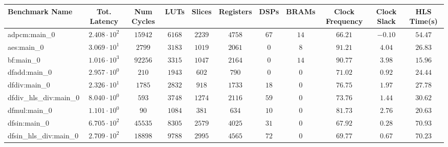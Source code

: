 \begin{tabular}{|l|c|c|c|c|c|c|c|c|c|c|}
\hline
Benchmark Name          & Tot. Latency           & Num Cycles & LUTs      & Slices    & Registers & DSPs    & BRAMs   & Clock Frequency & Clock Slack & HLS Time(s) \\
\hline
adpcm:main\_0           & $ 2.408 \cdot 10^{2} $ & $ 15942  $ & $ 6168  $ & $ 2239  $ & $ 4758  $ & $ 67  $ & $ 14  $ & $ 66.21       $ & $ -0.10   $ & $ 54.47   $ \\
aes:main\_0             & $ 3.069 \cdot 10^{1} $ & $ 2799   $ & $ 3183  $ & $ 1019  $ & $ 2061  $ & $ 0   $ & $ 8   $ & $ 91.21       $ & $ 4.04    $ & $ 26.83   $ \\
bf:main\_0              & $ 1.016 \cdot 10^{3} $ & $ 92256  $ & $ 3315  $ & $ 1047  $ & $ 2164  $ & $ 0   $ & $ 14  $ & $ 90.77       $ & $ 3.98    $ & $ 15.96   $ \\
dfadd:main\_0           & $ 2.957 \cdot 10^{0} $ & $ 210    $ & $ 1943  $ & $ 602   $ & $ 790   $ & $ 0   $ & $ 0   $ & $ 71.02       $ & $ 0.92    $ & $ 24.44   $ \\
dfdiv:main\_0           & $ 2.326 \cdot 10^{1} $ & $ 1785   $ & $ 2832  $ & $ 918   $ & $ 1733  $ & $ 18  $ & $ 0   $ & $ 76.75       $ & $ 1.97    $ & $ 27.78   $ \\
dfdiv\_hls\_div:main\_0 & $ 8.040 \cdot 10^{0} $ & $ 593    $ & $ 3748  $ & $ 1274  $ & $ 2116  $ & $ 59  $ & $ 0   $ & $ 73.76       $ & $ 1.44    $ & $ 30.62   $ \\
dfmul:main\_0           & $ 1.101 \cdot 10^{0} $ & $ 90     $ & $ 1084  $ & $ 381   $ & $ 634   $ & $ 10  $ & $ 0   $ & $ 81.73       $ & $ 2.76    $ & $ 20.63   $ \\
dfsin:main\_0           & $ 6.705 \cdot 10^{2} $ & $ 45535  $ & $ 8305  $ & $ 2579  $ & $ 4025  $ & $ 31  $ & $ 0   $ & $ 67.92       $ & $ 0.28    $ & $ 70.93   $ \\
dfsin\_hls\_div:main\_0 & $ 2.709 \cdot 10^{2} $ & $ 18898  $ & $ 9788  $ & $ 2995  $ & $ 4565  $ & $ 72  $ & $ 0   $ & $ 69.77       $ & $ 0.67    $ & $ 70.23   $ \\

\end{tabular}
